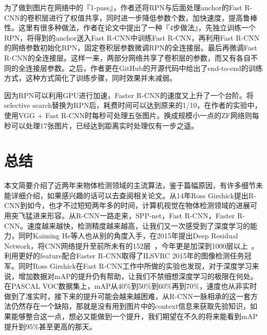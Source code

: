 \documentclass[10pt,twocolumn,letterpaper]{article}
\begin{document}
为了做到图片在网络中的『1-pass』，作者还将RPN与后面处理anchor的Fast R-CNN的卷积层进行了权值共享，同时进一步降低参数个数，加快速度，提高鲁棒性。这里有很多种做法，作者在论文中提出了一种『4步做法』，先独立训练一个RPN，将得到的anchor送入Fast R-CNN中训练Fast R-CNN，再利用Fast R-CNN的网络参数初始化RPN，固定卷积层参数微调RPN的全连接层。最后再微调Fast R-CNN的全连接层。这样一来，两部分网络共享了卷积层的参数，而又有各自不同的全连接层参数。之后，作者更在GitHub的开源代码中给出了end-to-end的训练方式，这种方式简化了训练步骤，同时效果并未减弱。

因为RPN可以利用GPU进行加速，Faster R-CNN的速度又上升了一个台阶。将selective search替换为RPN后，耗费时间可以达到原来的1/10，在作者的实验中，使用VGG + Fast R-CNN时每秒可处理五张图片。换成规模小一点的ZF网络则每秒可以处理17张图片，已经达到距离实时处理仅有一步之遥。


\section{总结}
本文简要介绍了近两年来物体检测领域的主流算法，鉴于篇幅原因，有许多细节未能详细介绍，如果感兴趣的话可以去查阅相关论文。从14年Ross Girshick提出R-CNN到如今，也才不过短短两年多的时间，计算机视觉在物体检测领域的进展可用突飞猛进来形容。从R-CNN一路走来，SPP-net，Fast R-CNN，Faster R-CNN。速度越来越快，检测精度越来越高，让我们又一次感受到了深度学习的能力，同时Kaiming He等人也从别的角度入手，在2015年提出Deep Residual Network，将CNN网络提升至前所未有的152层~\cite{He2015}，今年更是加深到1000层以上~\cite{He2016}。利用更好的feature配合Faster R-CNN取得了ILSVRC 2015年的图像检测任务冠军。同时Ross Girshick在Fast R-CNN工作中所做的实验也发现，对于深度学习来说，增加数据对mAP的提升仍有帮助，让我们不禁细想深度学习的极限在何处。在PASCAL VOC数据集上，mAP从40\%到50\%到60\%再到70\%，速度也从非实时做到了准实时，接下来的提升可能会越来越困难，从R-CNN一脉相承的这一套方法仍然存在一个缺陷，那就是没有用到图片中的context信息来获取先验知识，如果能够整合这一点，想必又能做到一个提升，我们期望在不久的将来能看到mAP提升到95\%甚至更高的那天。
\end{document}
